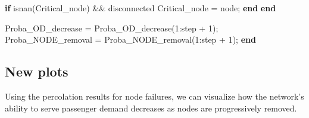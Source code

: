 \documentclass[
  letterpaper,
  DIV=11,
  numbers=noendperiod]{scrartcl}
\newenvironment{Shaded}{\begin{snugshade}}{\end{snugshade}}
\newcommand{\FloatTok}[1]{\textcolor[rgb]{0.68,0.00,0.00}{#1}}
\newcommand{\KeywordTok}[1]{\textcolor[rgb]{0.00,0.23,0.31}{\textbf{#1}}}
\newcommand{\NormalTok}[1]{\textcolor[rgb]{0.00,0.23,0.31}{#1}}
\newcommand{\OperatorTok}[1]{\textcolor[rgb]{0.37,0.37,0.37}{#1}}
\newcommand{\VariableTok}[1]{\textcolor[rgb]{0.07,0.07,0.07}{#1}}
\begin{document}
\begin{Shaded}
\begin{Highlighting}[]
      \KeywordTok{if} \VariableTok{isnan}\NormalTok{(}\VariableTok{Critical\_node}\NormalTok{) }\OperatorTok{\&\&} \VariableTok{disconnected}
          \VariableTok{Critical\_node} \OperatorTok{=} \VariableTok{node}\OperatorTok{;}
      \KeywordTok{end}
\KeywordTok{end}

\VariableTok{Proba\_OD\_decrease} \OperatorTok{=} \VariableTok{Proba\_OD\_decrease}\NormalTok{(}\FloatTok{1}\OperatorTok{:}\VariableTok{step} \OperatorTok{+} \FloatTok{1}\NormalTok{)}\OperatorTok{;}
\VariableTok{Proba\_NODE\_removal} \OperatorTok{=} \VariableTok{Proba\_NODE\_removal}\NormalTok{(}\FloatTok{1}\OperatorTok{:}\VariableTok{step} \OperatorTok{+} \FloatTok{1}\NormalTok{)}\OperatorTok{;}
\KeywordTok{end}
\end{Highlighting}
\end{Shaded}

\subsection{New plots}\label{new-plots}

Using the percolation results for node failures, we can visualize how
the network's ability to serve passenger demand decreases as nodes are
progressively removed.
\end{document}
